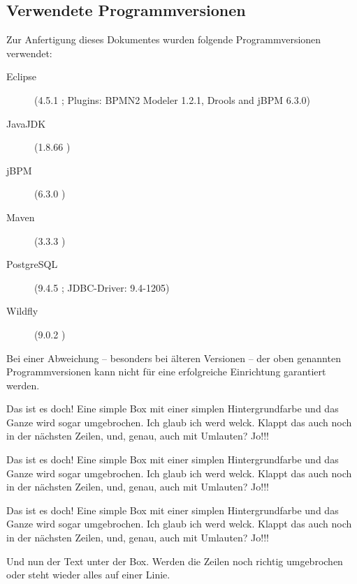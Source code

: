 \subsection{Verwendete Programmversionen}
Zur Anfertigung dieses Dokumentes wurden folgende Programmversionen verwendet:
\begin{description}
	\item[Eclipse] (4.5.1 ; Plugins: BPMN2 Modeler 1.2.1, Drools and jBPM 6.3.0)
	\item[JavaJDK] (1.8.66 ) 
	\item[jBPM] (6.3.0 )
	\item[Maven] (3.3.3 )
	\item[PostgreSQL] (9.4.5 ; JDBC-Driver: 9.4-1205)
	\item[Wildfly] (9.0.2 )
\end{description}
Bei einer Abweichung -- besonders bei älteren Versionen -- der oben genannten Programmversionen kann nicht für eine erfolgreiche Einrichtung garantiert werden.

\begin{hint}
	Das ist es doch! Eine simple Box mit einer simplen Hintergrundfarbe und das Ganze wird sogar umgebrochen. Ich glaub ich werd welck. Klappt das auch noch in der nächsten Zeilen, und, genau, auch mit Umlauten? Jo!!! 
\end{hint}

\begin{information}
	Das ist es doch! Eine simple Box mit einer simplen Hintergrundfarbe und das Ganze wird sogar umgebrochen. Ich glaub ich werd welck. Klappt das auch noch in der nächsten Zeilen, und, genau, auch mit Umlauten? Jo!!! 
\end{information}

\begin{warning}
	Das ist es doch! Eine simple Box mit einer simplen Hintergrundfarbe und das Ganze wird sogar umgebrochen. Ich glaub ich werd welck. Klappt das auch noch in der nächsten Zeilen, und, genau, auch mit Umlauten? Jo!!! 
\end{warning}

Und nun der Text unter der Box. Werden die Zeilen noch richtig umgebrochen oder steht wieder alles auf einer Linie.
